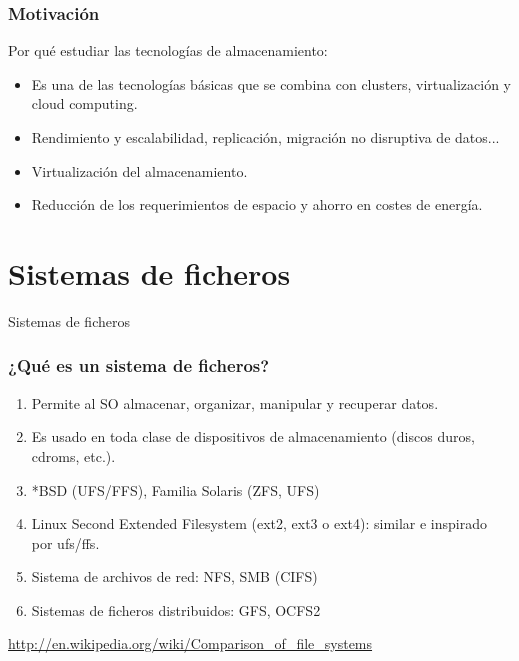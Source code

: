\documentclass{beamer}
\begin{document}
\begin{frame}
  \frametitle{Motivación}

Por qué estudiar las tecnologías de almacenamiento:

  \begin{itemize}
    \item Es una de las tecnologías básicas que se combina con clusters, virtualización y cloud computing. 
    \item Rendimiento y escalabilidad, replicación, migración no disruptiva de datos...
    \item Virtualización del almacenamiento.
    \item Reducción de los requerimientos de espacio y ahorro en costes de energía. 
  \end{itemize}
\end{frame}


\section{Sistemas de ficheros}

\begin{frame}
  \begin{center}
    \Huge{Sistemas de ficheros}
  \end{center}
\end{frame}


\begin{frame}
  \frametitle{¿Qué es un sistema de ficheros?}
  \begin{enumerate}
    \item Permite al SO almacenar, organizar, manipular y recuperar datos.
    \item Es usado en toda clase de dispositivos de almacenamiento (discos duros, cdroms, etc.).
    \item *BSD (UFS/FFS), Familia Solaris (ZFS, UFS)
    \item Linux Second Extended Filesystem (ext2, ext3 o ext4): similar e inspirado por ufs/ffs.
    \item Sistema de archivos de red: NFS, SMB (CIFS)
    \item Sistemas de ficheros distribuidos: GFS, OCFS2
  \end{enumerate}

\small{\url{http://en.wikipedia.org/wiki/Comparison_of_file_systems}}

\end{frame}
\end{document}
